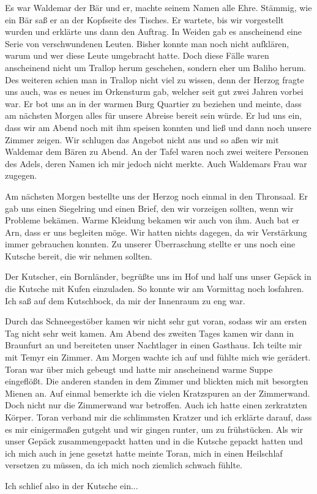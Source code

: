\documentclass[11pt]{scrreprt}
\begin{document}
Es war Waldemar der Bär und er, machte seinem Namen alle Ehre. Stämmig, wie ein Bär saß er an der Kopfseite des Tisches. Er wartete, bis wir vorgestellt wurden und erklärte uns dann den Auftrag. In Weiden gab es anscheinend eine Serie von verschwundenen Leuten. Bisher konnte man noch nicht aufklären, warum und wer diese Leute umgebracht hatte. Doch diese Fälle waren anscheinend nicht um Trallop herum geschehen, sondern eher um Baliho herum. Des weiteren schien man in Trallop nicht viel zu wissen, denn der Herzog fragte uns auch, was es neues im Orkensturm gab, welcher seit gut zwei Jahren vorbei war. Er bot uns an in der warmen Burg Quartier zu beziehen und meinte, dass am nächsten Morgen alles für unsere Abreise bereit sein würde. Er lud uns ein, dass wir am Abend noch mit ihm speisen konnten und ließ und dann noch unsere Zimmer zeigen. Wir schlugen das Angebot nicht aus und so aßen wir mit Waldemar dem Bären zu Abend. An der Tafel waren noch zwei weitere Personen des Adels, deren Namen ich mir jedoch nicht merkte. Auch Waldemars Frau war zugegen.\par
Am nächsten Morgen bestellte uns der Herzog noch einmal in den Thronsaal. Er gab uns einen Siegelring und einen Brief, den wir vorzeigen sollten, wenn wir Probleme bekämen. Warme Kleidung bekamen wir auch von ihm. Auch bat er Arn, dass er uns begleiten möge. Wir hatten nichts dagegen, da wir Verstärkung immer gebrauchen konnten. Zu unserer Überraschung stellte er uns noch eine Kutsche bereit, die wir nehmen sollten.\par
Der Kutscher, ein Bornländer, begrüßte uns im Hof und half uns unser Gepäck in die Kutsche mit Kufen einzuladen. So konnte wir am Vormittag noch losfahren. Ich saß auf dem Kutschbock, da mir der Innenraum zu eng war.\par
Durch das Schneegestöber kamen wir nicht sehr gut voran, sodass wir am ersten Tag nicht sehr weit kamen. Am Abend des zweiten Tages kamen wir dann in Braunfurt an und bereiteten unser Nachtlager in einen Gasthaus. Ich teilte mir mit Temyr ein Zimmer. Am Morgen wachte ich auf und fühlte mich wie gerädert. Toran war über mich gebeugt und hatte mir anscheinend warme Suppe eingeflößt. Die anderen standen in dem Zimmer und blickten mich mit besorgten Mienen an. Auf einmal bemerkte ich die vielen Kratzspuren an der Zimmerwand. Doch nicht nur die Zimmerwand war betroffen. Auch ich hatte einen zerkratzten Körper. Toran verband mir die schlimmsten Kratzer und ich erklärte darauf, dass es mir einigermaßen gutgeht und wir gingen runter, um zu frühstücken. Als wir unser Gepäck zusammengepackt hatten und in die Kutsche gepackt hatten und ich mich auch in jene gesetzt hatte meinte Toran, mich in einen Heilschlaf versetzen zu müssen, da ich mich noch ziemlich schwach fühlte.\par
Ich schlief also in der Kutsche ein... 
\end{document}
